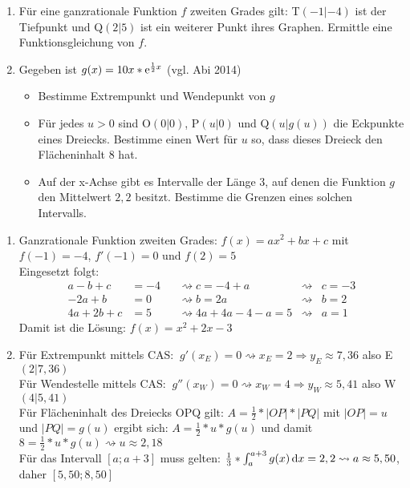 \begin{enumerate}
	\item Für eine ganzrationale Funktion $f$ zweiten Grades gilt: T$(-1|-4)$ ist der Tiefpunkt und Q$(2|5)$ ist ein weiterer Punkt ihres Graphen. Ermittle eine Funktionsgleichung von $f$.
	\item Gegeben ist $g(x)=10x*\mathrm{e}^{\frac{1}{2}x}$ (vgl. Abi 2014)\cas\begin{itemize}
		\item Bestimme Extrempunkt und Wendepunkt von $g$
		\item Für jedes $u>0$ sind O$(0|0)$, P$(u|0)$ und Q$(u|g(u))$ die Eckpunkte eines Dreiecks. Bestimme einen Wert für $u$ so, dass dieses Dreieck den Flächeninhalt $8$ hat.
		\item Auf der x-Achse gibt es Intervalle der Länge 3, auf denen die Funktion $g$ den Mittelwert $2,2$ besitzt. Bestimme die Grenzen eines solchen Intervalls.
	\end{itemize}
\end{enumerate}

\begin{lsg}{}
\begin{enumerate}
	\item Ganzrationale Funktion zweiten Grades: $f(x)=ax^2+bx+c$ mit $f(-1)=-4$, $f'(-1)=0$ und $f(2)=5$\\
	Eingesetzt folgt:\begin{align*}
		a-b+c&=-4&& \rightsquigarrow c=-4+a&\rightsquigarrow &c=-3\\
		-2a+b&=0&&\rightsquigarrow b=2a &\rightsquigarrow &b=2\\
		4a+2b+c&=5&&\rightsquigarrow 4a+4a-4-a=5&\rightsquigarrow &a=1
	\end{align*}
Damit ist die Lösung: $f(x)=x^2+2x-3$
	\item Für Extrempunkt mittels CAS: $\ g'(x_E)=0\rightsquigarrow x_E=2\Rightarrow y_E\approx 7,36$ also E$(2|7,36)$\\
	Für Wendestelle mittels CAS: $\ g''(x_W)=0 \rightsquigarrow x_W=4 \Rightarrow y_W\approx 5,41$ also W$(4|5,41)$\\
	Für Flächeninhalt des Dreiecks OPQ gilt: $A=\frac{1}{2}* |OP|*|PQ|$ mit $|OP|=u$ und $|PQ|=g(u)$ ergibt sich:
	$A=\frac{1}{2}*u*g(u)$ und damit $8=\frac{1}{2}*u*g(u) \rightsquigarrow u\approx 2,18$\\
	Für das Intervall $[a;a+3]$ muss gelten: $\frac{1}{3}*\int_a^{a+3} g(x) \,\mathrm{d} x =2,2\rightsquigarrow a \approx 5,50$, daher $[5,50;8,50]$
	

\end{enumerate}
\end{lsg}


